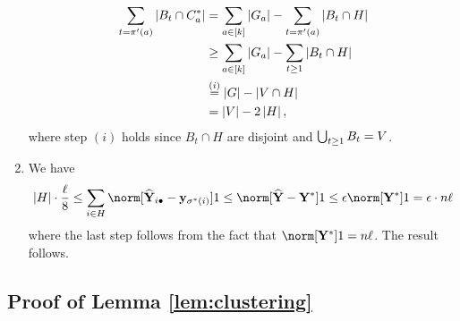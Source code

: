 \begin{enumerate}
\begin{align*}
\sum_{t=\pi'(a)}\left|B_{t}\cap C_{a}^{*}\right| & =\sum_{a\in\left[k\right]}\left|G_{a}\right|-\sum_{t=\pi'(a)}\left|B_{t}\cap H\right|\\
 & \ge\sum_{a\in\left[k\right]}\left|G_{a}\right|-\sum_{t\ge1}\left|B_{t}\cap H\right|\\
 & \overset{(i)}{=}\left|G\right|-\left|V\cap H\right|\\
 & =\left|V\right|-2\left|H\right|,
\end{align*}
where step $(i)$ holds since $B_{t}\cap H$ are disjoint and $\bigcup_{t\geq1}B_{t}=V$.
\item We have 
\[
\left|H\right|\cdot\frac{\size}{8}\leq\sum_{i\in H}\norm[\Yhat_{i\bullet}-\y_{\labelstar(i)}]1\leq\norm[\Yhat-\Ystar]1\leq\epsilon\norm[\Ystar]1=\epsilon\cdot\num\size
\]
where the last step follows from the fact that $\norm[\Ystar]1=\num\size$.
The result follows.
\end{enumerate}

\subsection{Proof of Lemma \ref{lem:clustering}\label{sec:proof_clustering}}

